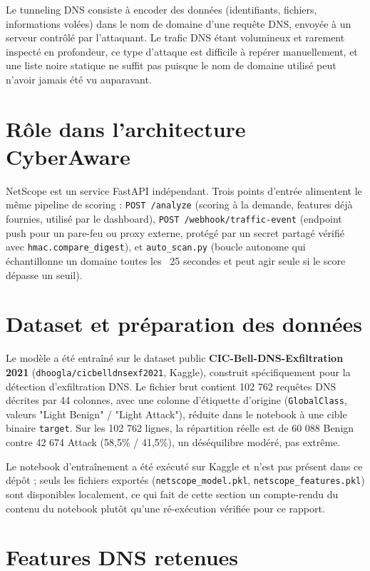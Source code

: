 \documentclass[12pt,a4paper]{report}
\begin{document}
Le tunneling DNS consiste à encoder des données (identifiants, fichiers, informations volées) dans le nom de domaine d'une requête DNS, envoyée à un serveur contrôlé par l'attaquant. Le trafic DNS étant volumineux et rarement inspecté en profondeur, ce type d'attaque est difficile à repérer manuellement, et une liste noire statique ne suffit pas puisque le nom de domaine utilisé peut n'avoir jamais été vu auparavant.

\section{Rôle dans l'architecture CyberAware}

NetScope est un service FastAPI indépendant. Trois points d'entrée alimentent le même pipeline de scoring : \texttt{POST /analyze} (scoring à la demande, features déjà fournies, utilisé par le dashboard), \texttt{POST /webhook/traffic-event} (endpoint push pour un pare-feu ou proxy externe, protégé par un secret partagé vérifié avec \texttt{hmac.compare\_digest}), et \texttt{auto\_scan.py} (boucle autonome qui échantillonne un domaine toutes les ~25 secondes et peut agir seule si le score dépasse un seuil).

\section{Dataset et préparation des données}

Le modèle a été entraîné sur le dataset public \textbf{CIC-Bell-DNS-Exfiltration 2021} (\texttt{dhoogla/cicbelldnsexf2021}, Kaggle), construit spécifiquement pour la détection d'exfiltration DNS. Le fichier brut contient 102 762 requêtes DNS décrites par 44 colonnes, avec une colonne d'étiquette d'origine (\texttt{GlobalClass}, valeurs "Light Benign" / "Light Attack"), réduite dans le notebook à une cible binaire \texttt{target}. Sur les 102 762 lignes, la répartition réelle est de 60 088 Benign contre 42 674 Attack (58,5\% / 41,5\%), un déséquilibre modéré, pas extrême.

Le notebook d'entraînement a été exécuté sur Kaggle et n'est pas présent dans ce dépôt ; seuls les fichiers exportés (\texttt{netscope\_model.pkl}, \texttt{netscope\_features.pkl}) sont disponibles localement, ce qui fait de cette section un compte-rendu du contenu du notebook plutôt qu'une ré-exécution vérifiée pour ce rapport.

\section{Features DNS retenues}
\end{document}

